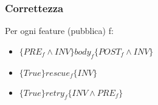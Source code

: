 \subsubsection{Correttezza}
Per ogni feature (pubblica) f:\\
\begin{itemize}
    \item \(\{PRE_f \land INV\} body_f \{POST_f \land INV\}\)
    \item \(\{True\} rescue_f \{INV\}\)
    \item \(\{True\} retry_f \{INV \land PRE_f\}\)
\end{itemize}

\begin{comment}

#################################
Simo

Non abbiamo solo dei svantaggi ma anche vantaggi.
Il lavoro dell'implementatore è particolarmente facile quando: Q è True (vera per ogni risultato!) o quando P è False (l’utilizzatore non riuscir`a mai a portare il sistema in uno stato in cui tocchi fare qualcosa!). Weakest precondition (data Q) o strongest postcondition (data P) determinano il ruolo di una feature.

Eiffel è un linguaggio orientato agli oggetti che introduce i contratti nell'interfaccia delle classi. 
Gli oggetti non lavorano con i metodi ma con le feature.
Le feature possono avere dei vincoli di visibilità (come public, private in java). 

require : (pre-condizione) 
do : (implementazione) è un ordine, un comando da eseguire
ensure : (post-condizione) predicato logico, controllo. Come ti aspetti che il mondo sia)

feature 
    decrement
    
    require
        item > 0
    do
        item := item - 1
    ensure
        item = old item - 1
    end

In require ho la post-condizione che deve essere verificata, se non ho item > 0, il contratto fallisce. In do ho l'implementazione, in questo caso un assegnamento e in ensure viene definito il fatto che al termine item avrà lo stesso valore decrementato di 1.
Le post-condition sono simili all'implementazione. 

C'è la classe da cui si inizia: root class
Da questa root class devo poter creare gli altri oggetti. 
Ogni classe ha un costruttore.
La feature none è accessibile solo a sé stessa (simile al private)
make 


feature {NONE}
è accessibile solo dalla classe


\end{comment}
